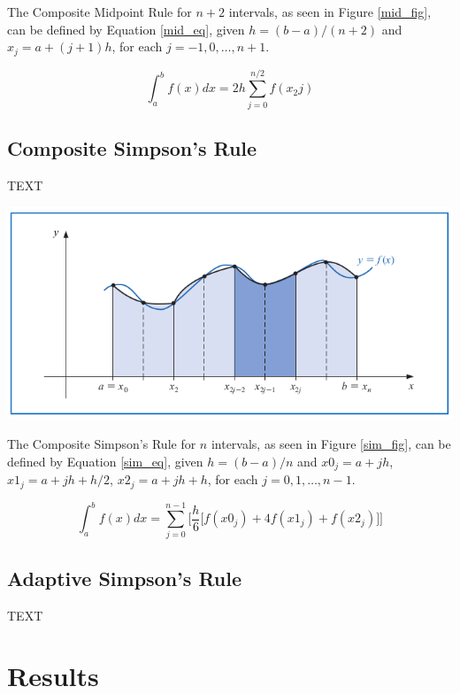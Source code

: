 \documentclass[a4paper]{article}
\begin{document}
The Composite Midpoint Rule for $n+2$ intervals, as seen in Figure \ref{mid_fig}, can be defined by Equation \ref{mid_eq}, given $h=(b-a)/(n+2)$ and $x_j=a+(j+1)h$, for each $j=-1,0,\dots,n+1$\cite{burden2010}.

\begin{equation}
\int_{a}^b f(x) dx = 2h \sum_{j=0}^{n/2}f(x_2j)
\label{mid_eq}
\end{equation}

\subsection{Composite Simpson's Rule}
TEXT

\begin{center}
	\includegraphics[width=1\textwidth]{../additional/simpsons_fig.png}
	\label{sim_fig}
\end{center}

The Composite Simpson's Rule for $n$ intervals, as seen in Figure \ref{sim_fig}, can be defined by Equation \ref{sim_eq}, given $h=(b-a)/n$ and $x0_j=a+jh$, $x1_j=a+jh+h/2$, $x2_j=a+jh+h$,  for each $j=0,1,\dots,n-1$.
 
    
\begin{equation}
\int_{a}^b f(x) dx = \sum_{j=0}^{n-1} \Bigg[ \frac{h}{6} \big[ f(x0_j) + 4f(x1_j) + f(x2_j) \big] \Bigg]
\label{sim_eq}
\end{equation}



\subsection{Adaptive Simpson's Rule}
TEXT



\newpage
\section{Results}
\label{sec:results}
\end{document}
